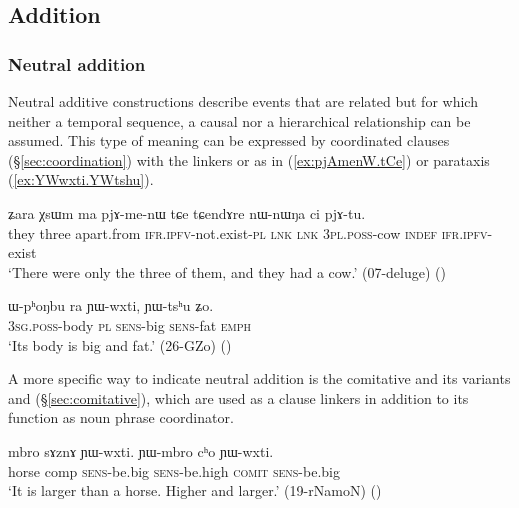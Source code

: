  \subsection{Addition} \label{sec:addition.clauses}
 
\subsubsection{Neutral addition} \label{sec:neutral.addition}
Neutral additive constructions describe events that are related but for which neither a temporal sequence, a causal nor a hierarchical relationship can be assumed. This type of meaning can be expressed by coordinated clauses (§\ref{sec:coordination}) with the linkers  or  as in (\ref{ex:pjAmenW.tCe}) or parataxis (\ref{ex:YWwxti.YWtshu}).


 \begin{exe}
\ex \label{ex:pjAmenW.tCe}
\gll ʑara χsɯm ma pjɤ-me-nɯ tɕe tɕendɤre nɯ-nɯŋa ci pjɤ-tu. \\
they three apart.from \textsc{ifr}.\textsc{ipfv}-not.exist-\textsc{pl} \textsc{lnk} \textsc{lnk} \textsc{3pl}.\textsc{poss}-cow \textsc{indef} \textsc{ifr}.\textsc{ipfv}-exist \\
\glt `There were only the three of them, and they had a cow.' (07-deluge)
()
\end{exe}
 

\begin{exe}
\ex \label{ex:YWwxti.YWtshu}
\gll ɯ-pʰoŋbu ra ɲɯ-wxti, ɲɯ-tsʰu ʑo.  \\
\textsc{3sg}.\textsc{poss}-body \textsc{pl} \textsc{sens}-big \textsc{sens}-fat \textsc{emph} \\
\glt `Its body is big and fat.' (26-GZo)
()
\end{exe}
 
 A more specific way to indicate neutral addition is the comitative  and its variants  and  (§\ref{sec:comitative}), which are used as a clause linkers in addition to its function as noun phrase coordinator.
 
\begin{exe}
\ex \label{ex:YWwxti.cho.YWwxti}
\gll  mbro sɤznɤ ɲɯ-wxti. ɲɯ-mbro cʰo ɲɯ-wxti. \\
horse comp \textsc{sens}-be.big  \textsc{sens}-be.high  \textsc{comit} \textsc{sens}-be.big \\
\glt `It is larger than a horse. Higher and larger.'  (19-rNamoN)
	()
\end{exe}
 
